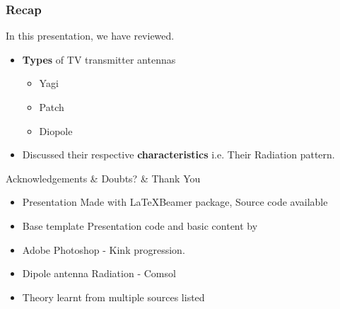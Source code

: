 \documentclass{beamer}
\begin{document}
\begin{frame}
\frametitle{Recap}
In this presentation, we have reviewed.

\begin{itemize}
    \item \textbf{Types} of TV transmitter antennas 
    \begin{itemize}
        \item Yagi
        \item Patch
        \item Diopole
    \end{itemize}
    \item Discussed their respective \textbf{characteristics} i.e. Their Radiation pattern.
    
\end{itemize}


\end{frame}

\begin{frame}{Acknowledgements \& Doubts? \& Thank You}
    \begin{itemize}
        \item Presentation Made with \LaTeX Beamer package, Source code available \href{https://airgapflux.co.in/?search=Antenna&subject=coel&restype=0}{}
        \item Base template Presentation code and basic content by {}
        \item Adobe Photoshop - Kink progression.        
        \item Dipole antenna Radiation - Comsol
        \item  Theory learnt from multiple sources listed \href{https://airgapflux.co.in/?search=Antenna&subject=coel&restype=0}{}
    \end{itemize}
\end{frame}
\end{document}
